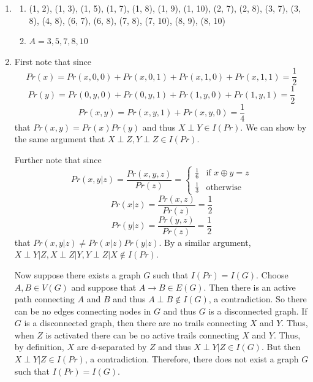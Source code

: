 \begin{enumerate}
\item
  \begin{enumerate}
  \def\labelenumii{\alph{enumii}.}
	  \item (1, 2), (1, 3), (1, 5), (1, 7), (1, 8), (1, 9), (1, 10), (2, 7), (2, 8), (3, 7), (3, 8), (4, 8), (6, 7), (6, 8), (7, 8), (7, 10), (8, 9), (8, 10)
	  \item $A = {3, 5, 7, 8, 10}$
  \end{enumerate}
\item First note that since 
  \begin{equation}
		Pr(x) = Pr(x, 0, 0) + Pr(x, 0, 1) + Pr(x, 1, 0) + Pr(x, 1, 1) = \frac{1}{2}
	\end{equation}
	\begin{equation}
		Pr(y) = Pr(0, y, 0) + Pr(0, y, 1) + Pr(1, y, 0) + Pr(1, y, 1) = \frac{1}{2}
	\end{equation}
\begin{equation}
	Pr(x, y) = Pr(x, y, 1) + Pr(x, y, 0) = \frac{1}{4}
\end{equation}
that $Pr(x, y) = Pr(x)Pr(y)$ and thus $X\perp Y \in I(Pr)$. We can show by the same argument that $X \perp Z, Y \perp Z \in I(Pr)$. 

Further note that since
\begin{equation}
	Pr(x, y | z) = 
		\frac{Pr(x, y, z)}{Pr(z)} = 
		\begin{cases}
			\frac{1}{6} & \mbox{if } x\oplus y = z \\
			\frac{1}{3}  & \mbox{otherwise}
		\end{cases}
  
\end{equation}
\begin{equation}
	Pr(x | z) = \frac{Pr(x, z)}{Pr(z)} = \frac{1}{2}
\end{equation}
\begin{equation}
	Pr(y | z) = \frac{Pr(y, z)}{Pr(z)} = \frac{1}{2}
\end{equation}
that $Pr(x, y | z) \not= Pr(x | z)Pr(y | z)$. By a similar argument, $X\perp Y | Z, X\perp Z |Y, Y \perp Z | X \not\in I(Pr)$.

Now suppose there exists a graph $G$ such that $I(Pr) = I(G)$. Choose $A, B \in V(G)$ and suppose that $A\to B \in E(G)$. Then there is an active path connecting $A$ and $B$ and thus $A \perp B\not\in I(G)$, a contradiction. So there can be no edges connecting nodes in $G$ and thus $G$ is a disconnected graph. If $G$ is a disconnected graph, then there are no trails connecting $X$ and $Y$. Thus, when $Z$ is activated there can be no active trails connecting $X$ and $Y$. Thus, by definition, $X$ are d-separated by $Z$ and thus $X\perp Y | Z \in I(G)$. But then $X \perp Y | Z \in I(Pr)$, a contradiction. Therefore, there does not exist a graph $G$ such that $I(Pr) = I(G)$.


\end{enumerate}
